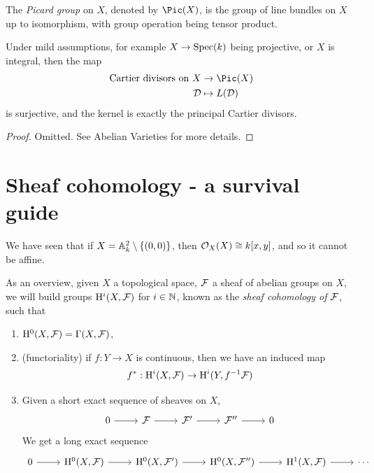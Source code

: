 \documentclass{article}
\begin{document}
\begin{definition}
     The \emph{Picard group} on \(X\), denoted by \(\Pic(X)\), is the group of line bundles on \(X\) up to isomorphism, with group operation being tensor product. 
\end{definition}

\begin{proposition}
    Under mild assumptions, for example \(X \to \operatorname{Spec}(k)\) being projective, or \(X\) is integral, then the map
    \begin{align*}
        \text{Cartier divisors on }X &\to \Pic(X) \\
        \mcD &\mapsto L(\mcD)
    \end{align*}
    is surjective, and the kernel is exactly the principal Cartier divisors.
\end{proposition}

\begin{proof}
    Omitted. See Abelian Varieties for more details.
\end{proof}


\section{Sheaf cohomology - a survival guide}

We have seen that if \(X = \mathbb{A}_{k}^{2} \setminus \{(0, 0)\}\), then \(\mathcal{O}_X(X) \cong k[x, y]\), and so it cannot be affine.

As an overview, given \(X\) a topological space, \(\mathcal{F}\) a sheaf of abelian groups on \(X\), we will build groups \(\mathrm{H}^i(X, \mathcal{F})\) for \(i \in \mathbb{N}\), known as the \emph{sheaf cohomology of \(\mathcal{F}\)}, such that
\begin{enumerate}
    \item \(\mathrm{H}^0(X, \mathcal{F}) = \Gamma(X, \mathcal{F})\),
    \item (functoriality) if \(f : Y \to X\) is continuous, then we have an induced map
    \[f^* : \mathrm{H}^i(X, \mathcal{F}) \to \mathrm{H}^i(Y, f^{-1}\mathcal{F})\] 
    \item Given a short exact sequence of sheaves on \(X\),
\[\begin{tikzcd}
	0 & \mcF & {\mcF'} & {\mcF''} & 0
	\arrow[from=1-1, to=1-2]
	\arrow[from=1-2, to=1-3]
	\arrow[from=1-3, to=1-4]
	\arrow[from=1-4, to=1-5]
\end{tikzcd}\]
    We get a long exact sequence
\[\begin{tikzcd}
	0 & {\HH^0(X, \mcF)} & {\HH^0(X, \mcF')} & {\HH^0(X, \mcF'')} & {\HH^1(X, \mcF)} & \cdots
	\arrow[from=1-1, to=1-2]
	\arrow[from=1-2, to=1-3]
	\arrow[from=1-3, to=1-4]
	\arrow[from=1-4, to=1-5]
	\arrow[from=1-5, to=1-6]
\end{tikzcd}\]
\end{enumerate}
\end{document}
